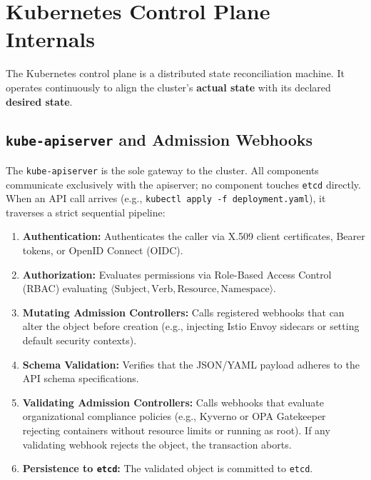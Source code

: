 \section{Kubernetes Control Plane Internals}

The Kubernetes control plane is a distributed state reconciliation machine. It operates continuously to align the cluster's \textbf{actual state} with its declared \textbf{desired state}.

\subsection{\texttt{kube-apiserver} and Admission Webhooks}
The \texttt{kube-apiserver} is the sole gateway to the cluster. All components communicate exclusively with the apiserver; no component touches \texttt{etcd} directly. When an API call arrives (e.g., \texttt{kubectl apply -f deployment.yaml}), it traverses a strict sequential pipeline:
\begin{enumerate}[leftmargin=15pt]
  \item \textbf{Authentication:} Authenticates the caller via X.509 client certificates, Bearer tokens, or OpenID Connect (OIDC).
  \item \textbf{Authorization:} Evaluates permissions via Role-Based Access Control (RBAC) evaluating $\langle \text{Subject}, \text{Verb}, \text{Resource}, \text{Namespace} \rangle$.
  \item \textbf{Mutating Admission Controllers:} Calls registered webhooks that can alter the object before creation (e.g., injecting Istio Envoy sidecars or setting default security contexts).
  \item \textbf{Schema Validation:} Verifies that the JSON/YAML payload adheres to the API schema specifications.
  \item \textbf{Validating Admission Controllers:} Calls webhooks that evaluate organizational compliance policies (e.g., Kyverno or OPA Gatekeeper rejecting containers without resource limits or running as root). If any validating webhook rejects the object, the transaction aborts.
  \item \textbf{Persistence to \texttt{etcd}:} The validated object is committed to \texttt{etcd}.
\end{enumerate}

